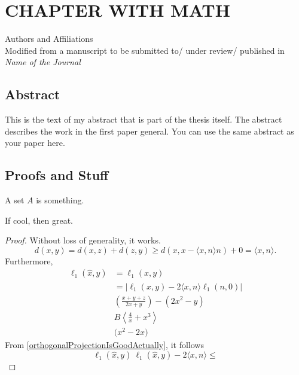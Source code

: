 \newcommand{\RipsD}{\operatorname{Rips}_1}
\newcommand{\Rips}{\operatorname{Rips}}
\newcommand{\ver}{\operatorname{ver}}
\newcommand{\diam}{\operatorname{Diam}}
\newcommand{\midR}{\operatorname{mid}}
\newcommand{\dN}{N_1^*}

\chapter{CHAPTER WITH MATH}
\begin{center}
  Authors and Affiliations \\
  Modified from a manuscript to be submitted to/ under review/ published in \textit{Name of the Journal}
\end{center}

\section{Abstract}
This is the text of my abstract that is part of the thesis itself.
The abstract describes the work in the first paper general. You can use the same abstract as your paper here.
\section{Proofs and Stuff}
\begin{definition}
  A set $A$ is something.
\end{definition}

\begin{lemma}
  If cool, then great.
  \label{lem2}
\end{lemma}
\begin{proof}
  Without loss of generality, it works.
  \begin{equation}
    \label{orthogonalProjectionIsGoodActually}
    d(x,y)= d(x,z)+d(z,y) \geq d(x,x-\langle x,n\rangle n )+0 = \langle x,n\rangle.
  \end{equation}
  Furthermore,
  \begin{align}
    \ell_1(\hat{x},y) & = \ell_1 (x,y)                                        \\
                      & =|\ell_1(x,y)-2\langle x,n\rangle \ell_1(n,0)|        \\
                      & \left(\frac{x+y+z}{2x+y}\right) - \left(2x^2-y\right) \\
                      & B\left\langle \frac{4}{x}+x^3\right\rangle            \\
                      & \Bigg(x^2-2x\Bigg)
  \end{align}
  From \autoref{orthogonalProjectionIsGoodActually}, it follows \[\ell_1(\hat{x},y)\ \ell_1(\hat{x},y)-2\langle x,n\rangle \leq\]
\end{proof}

